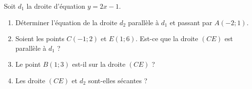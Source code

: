 
\begin{exercice}\label{exosmath-0610}

    Soit \( d_1\) la droite d'équation \( y=2x-1\).
    \begin{enumerate}
        \item
            Déterminer l'équation de la droite \( d_2\) parallèle à \( d_1\) et passant par \( A(-2;1)\).
        \item
            Soient les points \( C(-1;2)\) et \( E(1;6)\). Est-ce que la droite \( (CE)\) est parallèle à \( d_1\) ?
        \item
            Le point \( B(1;3)\) est-il sur la droite \( (CE)\) ?
        \item
            Les droite \( (CE)\) et \( d_2\) sont-elles sécantes ?
    \end{enumerate}

\end{exercice}
